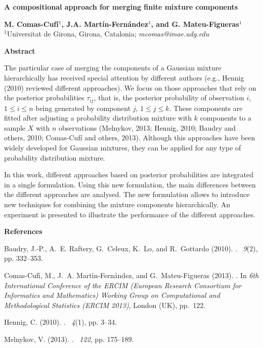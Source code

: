 \documentclass [10pt]{article}
\begin{document}
\begin{center}
\textbf{\large A compositional approach for merging finite mixture components}

\vskip 0.25cm

\textbf{M. Comas-Cufí}$^{1}$\textbf{, J.A. Martín-Fernández}$^{1}$\textbf{, and
G. Mateu-Figueras}$^{1}$ \\
{\small $^{1}$Universitat de Girona, Girona, Catalonia;
\textit{mcomas@imae.udg.edu}}
\end{center}

\vskip 0.5cm {\centerline{\bf Abstract}}

The particular case of merging the components of a Gaussian mixture hierarchically has received special attention by different authors (e.g., Hennig (2010) reviewed different approaches). We focus on those approaches that rely on the posterior probabilities $\tau_{ij}$, that is, the posterior probability of observation $i$, $1 \leq i \leq n$ being generated by component $j$, $1\leq j\leq k$. These components are fitted after adjusting a  probability distribution mixture with $k$ components  to a sample $X$ with $n$ observations (Melnykov, 2013; Hennig, 2010; Baudry and others, 2010; Comas-Cufí and others, 2013).  Although this approaches have been widely developed for Gaussian mixtures, they can be applied for any type of probability distribution mixture.

In this work, different approaches based on posterior probabilities are integrated in a single formulation. Using this new formulation, the main differences between the different approaches are analysed. The new formulation allows to introduce new techniques for combining the mixture components hierarchically.  An experiment is presented to illustrate the performance of the different approaches.

\vskip 0.2cm {\bf References}

\vspace{0.5mm}
\hangindent=0.5cm  %
Baudry, J.-P., A.~E. Raftery, G.~Celeux, K.~Lo, and R.~Gottardo (2010).
.
~{\em 9\/}(2), pp. 332--353.

\hangindent=0.5cm  %
Comas-Cuf\'{\i}, M., J.~A. Mart\'{\i}n-Fern\'{a}ndez, and G.~Mateu-Figueras
  (2013).
.
\newblock In {\em 6th International Conference of the ERCIM (European Research
  Consortium for Informatics and Mathematics) Working Group on Computational
  and Methodological Statistics (ERCIM 2013)}, London (UK), pp.\  122.

\hangindent=0.5cm  %
Hennig, C. (2010).
.
~{\em 4\/}(1), pp.  3--34.

\hangindent=0.5cm  %
Melnykov, V. (2013).
.
~{\em 122}, pp. 175--189.
\end{document}
